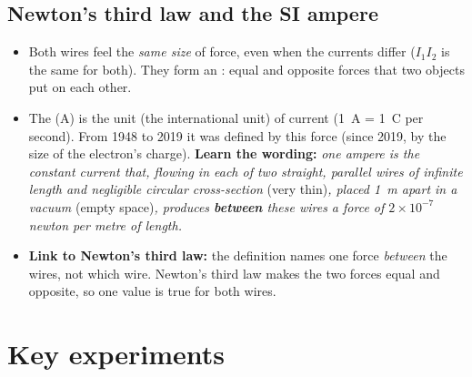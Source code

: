 \subsection{Newton's third law and the SI ampere}

\begin{itemize}
  \item Both wires feel the \emph{same size} of force, even when the currents differ ($I_1 I_2$ is
        the same for both). They form an : equal and opposite forces
        that two objects put on each other.
  \item The  (A) is the  unit (the international unit) of current
        (\qty{1}{A} = \qty{1}{C} per second). From 1948 to 2019 it was defined by this force
        (since 2019, by the size of the electron's charge).
        \textbf{Learn the wording:} \emph{one ampere is the constant current that, flowing in
        each of two straight, parallel wires of infinite length and negligible circular
        cross-section} (very thin)\emph{, placed \qty{1}{m} apart in a vacuum} (empty
        space)\emph{, produces \textbf{between} these wires a force of $2 \times 10^{-7}$
        newton per metre of length.}
  \item \textbf{Link to Newton's third law:} the definition names one force \emph{between} the
        wires, not which wire. Newton's third law makes the two forces equal and opposite, so one
        value is true for both wires.
\end{itemize}

\section{Key experiments}\label{ch2:sec:experiments}

